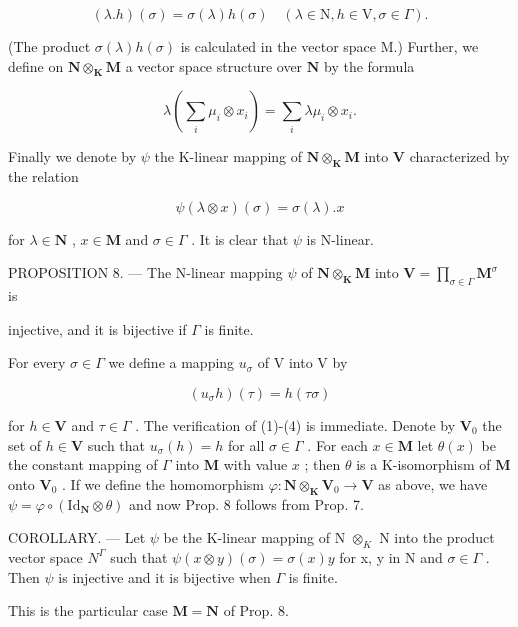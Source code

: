\[
(\lambda . h) (\sigma) = \sigma (\lambda) h (\sigma) \quad (\lambda \in \mathrm{N}, h \in \mathrm{V}, \sigma \in \Gamma).\tag{5}
\]

(The product \(\sigma(\lambda) h(\sigma)\) is calculated in the vector space M.) Further, we define on \(\mathbf{N} \otimes_{\mathbf{K}} \mathbf{M}\) a vector space structure over \(\mathbf{N}\) by the formula

\[
\lambda \left(\sum_ {i} \mu_ {i} \otimes x _ {i}\right) = \sum_ {i} \lambda \mu_ {i} \otimes x _ {i}.
\]

Finally we denote by \(\psi\) the K-linear mapping of \(\mathbf{N} \otimes_{\mathbf{K}} \mathbf{M}\) into \(\mathbf{V}\) characterized by the relation

\[
\psi (\lambda \otimes x) (\sigma) = \sigma (\lambda). x\tag{6}
\]

for \(\lambda \in \mathbf{N}\) , \(x \in \mathbf{M}\) and \(\sigma \in \Gamma\) . It is clear that \(\psi\) is N-linear.

PROPOSITION 8. --- The N-linear mapping \(\psi\) of \(\mathbf{N} \otimes_{\mathbf{K}} \mathbf{M}\) into \(\mathbf{V} = \prod_{\sigma \in \Gamma} \mathbf{M}^{\sigma}\) is

injective, and it is bijective if \(\Gamma\) is finite.

For every \(\sigma\in\Gamma\) we define a mapping \(u_{\sigma}\) of V into V by

\[
\left(u _ {\sigma} h\right) (\tau) = h (\tau \sigma)\tag{7}
\]

for \(h \in \mathbf{V}\) and \(\tau \in \Gamma\) . The verification of (1)-(4) is immediate. Denote by \(\mathbf{V}_0\) the set of \(h \in \mathbf{V}\) such that \(u_{\sigma}(h) = h\) for all \(\sigma \in \Gamma\) . For each \(x \in \mathbf{M}\) let \(\theta(x)\) be the constant mapping of \(\Gamma\) into \(\mathbf{M}\) with value \(x\) ; then \(\theta\) is a K-isomorphism of \(\mathbf{M}\) onto \(\mathbf{V}_0\) . If we define the homomorphism \(\varphi: \mathbf{N} \otimes_{\mathbf{K}} \mathbf{V}_0 \to \mathbf{V}\) as above, we have \(\psi = \varphi \circ (\mathrm{Id}_{\mathbf{N}} \otimes \theta)\) and now Prop. 8 follows from Prop. 7.

COROLLARY. --- Let \(\psi\) be the K-linear mapping of N \(\otimes_{K}\) N into the product vector space \(N^{\Gamma}\) such that \(\psi(x \otimes y) (\sigma) = \sigma(x)y\) for x, y in N and \(\sigma \in \Gamma\) . Then \(\psi\) is injective and it is bijective when \(\Gamma\) is finite.

This is the particular case \(\mathbf{M} = \mathbf{N}\) of Prop. 8.

